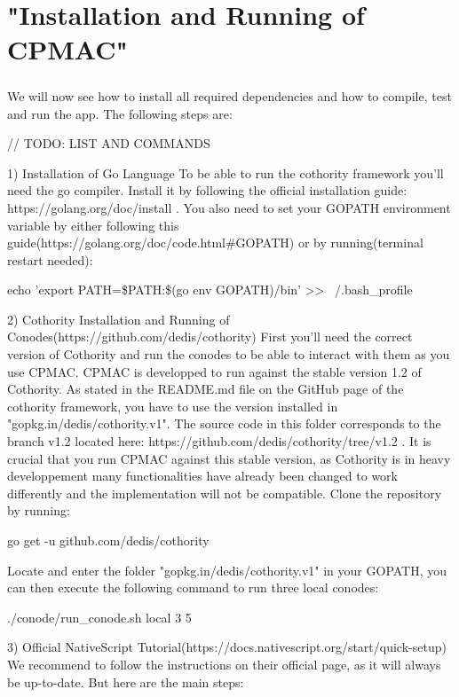 \chapter{"Installation and Running of CPMAC"}

\paragraph{}
We will now see how to install all required dependencies and how to compile, test and run the app. The following steps are:

// TODO: LIST AND COMMANDS

1) Installation of Go Language
To be able to run the cothority framework you'll need the go compiler. Install it by following the official installation guide: https://golang.org/doc/install . You also need to set your GOPATH environment variable by either following this guide(https://golang.org/doc/code.html\#GOPATH) or by running(terminal restart needed):

    echo 'export PATH=\$PATH:\$(go env GOPATH)/bin' >> ~/.bash\_profile

2) Cothority Installation and Running of Conodes(https://github.com/dedis/cothority)
First you'll need the correct version of Cothority and run the conodes to be able to interact with them as you use CPMAC. CPMAC is developped to run against the stable version 1.2 of Cothority. As stated in the README.md file on the GitHub page of the cothority framework, you have to use the version installed in "gopkg.in/dedis/cothority.v1". The source code in this folder corresponds to the branch v1.2 located here: https://github.com/dedis/cothority/tree/v1.2 . It is crucial that you run CPMAC against this stable version, as Cothority is in heavy developpement many functionalities have already been changed to work differently and the implementation will not be compatible.
Clone the repository by running:

    go get -u github.com/dedis/cothority

Locate and enter the folder "gopkg.in/dedis/cothority.v1" in your GOPATH, you can then execute the following command to run three local conodes:

    ./conode/run\_conode.sh local 3 5

3) Official NativeScript Tutorial(https://docs.nativescript.org/start/quick-setup)
We recommend to follow the instructions on their official page, as it will always be up-to-date. But here are the main steps:

